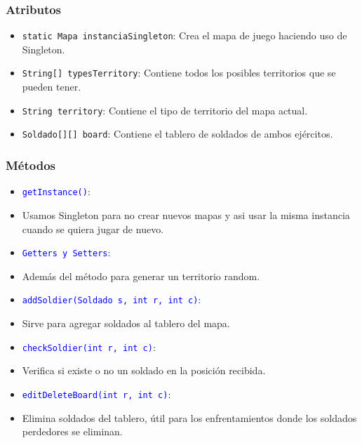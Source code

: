 \documentclass{article}
\begin{document}
\subsubsection{Atributos}
\begin{itemize}
    \item \texttt{static Mapa instanciaSingleton}: Crea el mapa de juego haciendo uso de Singleton.
    \item \texttt{String[] typesTerritory}: Contiene todos los posibles territorios que se pueden tener.
    \item \texttt{String territory}: Contiene el tipo de territorio del mapa actual.
    \item \texttt{Soldado[][] board}: Contiene el tablero de soldados de ambos ejércitos.
\end{itemize}


\subsubsection{Métodos}
\begin{itemize}
    \item \texttt{\textcolor{blue}{getInstance()}}: 
    \item Usamos Singleton para no crear nuevos mapas y asi usar la misma instancia cuando se quiera jugar de nuevo.
\end{itemize}

\begin{itemize}
    \item \texttt{\textcolor{blue}{Getters y Setters}}: 
    \item Además del método para generar un territorio random.
\end{itemize}

\begin{itemize}
    \item \texttt{\textcolor{blue}{addSoldier(Soldado s, int r, int c)}}: 
    \item Sirve para agregar soldados al tablero del mapa.
\end{itemize}

\begin{itemize}
    \item \texttt{\textcolor{blue}{checkSoldier(int r, int c)}}: 
    \item Verifica si existe o no un soldado en la posición recibida.
\end{itemize}

\begin{itemize}
    \item \texttt{\textcolor{blue}{editDeleteBoard(int r, int c)}}: 
    \item Elimina soldados del tablero, útil para los enfrentamientos donde los soldados perdedores se eliminan.
\end{itemize}

\end{document}
